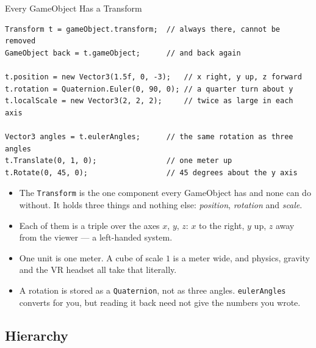 \begin{frame}[fragile]{Every GameObject Has a Transform}
  \begin{lstlisting}[basicstyle=\scriptsize\ttfamily]
Transform t = gameObject.transform;  // always there, cannot be removed
GameObject back = t.gameObject;      // and back again

t.position = new Vector3(1.5f, 0, -3);   // x right, y up, z forward
t.rotation = Quaternion.Euler(0, 90, 0); // a quarter turn about y
t.localScale = new Vector3(2, 2, 2);     // twice as large in each axis

Vector3 angles = t.eulerAngles;      // the same rotation as three angles
t.Translate(0, 1, 0);                // one meter up
t.Rotate(0, 45, 0);                  // 45 degrees about the y axis
  \end{lstlisting}
  \vspace{1ex}

  \begin{itemize}
    \item The \texttt{Transform} is the one component every GameObject has and
      none can do without. It holds three things and nothing else:
      \emph{position}, \emph{rotation} and \emph{scale}.
    \item Each of them is a triple over the axes $x$, $y$, $z$: $x$ to the
      right, $y$ up, $z$ away from the viewer --- a left-handed system.
    \item One unit is one meter. A cube of scale $1$ is a meter wide, and
      physics, gravity and the VR headset all take that literally.
    \item A rotation is stored as a \texttt{Quaternion}, not as three angles.
      \texttt{eulerAngles} converts for you, but reading it back need not give
      the numbers you wrote.
  \end{itemize}
\end{frame}


\subsection{Hierarchy}

